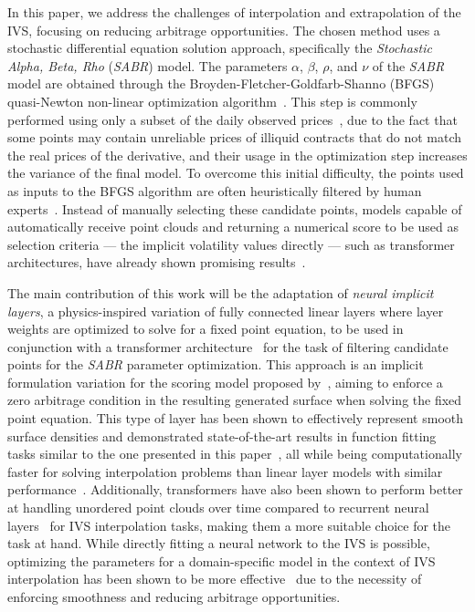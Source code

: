 In this paper, we address the challenges of interpolation and extrapolation of the IVS, focusing on reducing arbitrage opportunities.
The chosen method uses a stochastic differential equation solution approach, specifically the \textit{Stochastic Alpha, Beta, Rho} (\textit{SABR}) model.
The parameters $\alpha$, $\beta$, $\rho$, and $\nu$ of the \textit{SABR} model are obtained through the
Broyden-Fletcher-Goldfarb-Shanno (BFGS) quasi-Newton non-linear optimization algorithm~\citep{Broyden1970, Fletcher1970, Goldfarb1970, Shanno1970}.
This step is commonly performed using only a subset of the daily observed prices~\citep{Kim2021},
due to the fact that some points may contain unreliable prices of illiquid contracts that do not match the real prices of the derivative,
and their usage in the optimization step increases the variance of the final model.
To overcome this initial difficulty, the points used as inputs to the BFGS algorithm are often heuristically filtered by human experts~\citep{Hagan2002}.
Instead of manually selecting these candidate points, models capable of automatically
receive point clouds and returning a numerical score to be used as selection criteria --- the implicit volatility values directly ---
such as transformer architectures, have already shown promising results~\citep{Cao2020, Kim2021, Bae2024, Jerbi2020}.

The main contribution of this work will be the adaptation of \textit{neural implicit layers},
a physics-inspired variation of fully connected linear layers where layer weights are optimized to solve for a fixed point equation,
to be used in conjunction with a transformer architecture~\citep{Vaswani2017}
for the task of filtering candidate points for the \textit{SABR} parameter optimization.
This approach is an implicit formulation variation for the scoring model proposed by~\cite{Kim2021},
aiming to enforce a zero arbitrage condition in the resulting generated surface when solving the fixed point equation.
This type of layer has been shown to effectively represent smooth surface densities and demonstrated state-of-the-art results in function
fitting tasks similar to the one presented in this paper~\citep{Kawaguchi2021},
all while being computationally faster for solving interpolation problems than linear layer models with similar performance~\citep{Kolter2020}.
Additionally, transformers have also been shown to perform better at handling unordered point clouds over time compared to recurrent neural layers~\citep{Kim2024}
for IVS interpolation tasks, making them a more suitable choice for the task at hand.
While directly fitting a neural network to the IVS is possible,
optimizing the parameters for a domain-specific model in the context of IVS interpolation has been shown to be more effective~\citep{Almeida2023}
due to the necessity of enforcing smoothness and reducing arbitrage opportunities.

